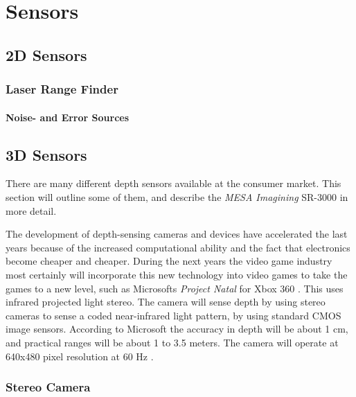 

\chapter{Sensors}


\section{2D Sensors}

\subsection{Laser Range Finder}


\subsubsection{Noise- and Error Sources}



\section{3D Sensors}
There are many different depth sensors available at the consumer market. This section will
outline some of them, and describe the \emph{MESA Imagining} SR-3000 in more detail.

The development of depth-sensing cameras and devices have accelerated the last years
because of the increased computational ability and the fact that electronics become
cheaper and cheaper. During the next years the video game industry most certainly will
incorporate this new technology into video games to take the games to a new level, such as
Microsofts \emph{Project Natal} for Xbox 360 \cite{project-natal}. This uses infrared
projected light stereo. The camera will sense depth by using stereo cameras to sense a
coded near-infrared light pattern, by using standard CMOS image sensors. According to
Microsoft the accuracy in depth will be about 1 cm, and practical ranges will be about
1 to 3.5 meters. The camera will operate at 640x480 pixel resolution at 60 Hz
\cite{conceivably-tech}.


\cite{low-cost-depthcameras}



\subsection{Stereo Camera}


